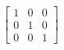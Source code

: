 \documentclass[preview]{standalone}
\begin{document}
\begin{align*}
\begin{bmatrix} 1 & 0 & 0\\0 & 1 & 0\\ 0 & 0 & 1\end{bmatrix}
\end{align*}
\end{document}
